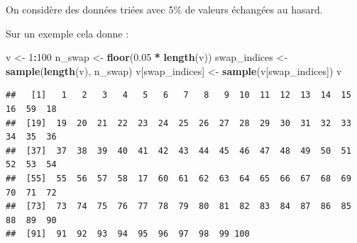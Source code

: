 \documentclass[
]{article}
\newenvironment{Shaded}{\begin{snugshade}}{\end{snugshade}}
\newcommand{\DecValTok}[1]{\textcolor[rgb]{0.00,0.00,0.81}{#1}}
\newcommand{\FloatTok}[1]{\textcolor[rgb]{0.00,0.00,0.81}{#1}}
\newcommand{\FunctionTok}[1]{\textcolor[rgb]{0.13,0.29,0.53}{\textbf{#1}}}
\newcommand{\NormalTok}[1]{#1}
\newcommand{\OtherTok}[1]{\textcolor[rgb]{0.56,0.35,0.01}{#1}}
\newcommand{\SpecialCharTok}[1]{\textcolor[rgb]{0.81,0.36,0.00}{\textbf{#1}}}
\begin{document}
On considère des données triées avec 5\% de valeurs échangées au hasard.

Sur un exemple cela donne :

\begin{Shaded}
\begin{Highlighting}[]
\NormalTok{v }\OtherTok{\textless{}{-}} \DecValTok{1}\SpecialCharTok{:}\DecValTok{100}
\NormalTok{n\_swap }\OtherTok{\textless{}{-}} \FunctionTok{floor}\NormalTok{(}\FloatTok{0.05} \SpecialCharTok{*} \FunctionTok{length}\NormalTok{(v))}
\NormalTok{swap\_indices }\OtherTok{\textless{}{-}} \FunctionTok{sample}\NormalTok{(}\FunctionTok{length}\NormalTok{(v), n\_swap)}
\NormalTok{v[swap\_indices] }\OtherTok{\textless{}{-}} \FunctionTok{sample}\NormalTok{(v[swap\_indices])}
\NormalTok{v}
\end{Highlighting}
\end{Shaded}

\begin{verbatim}
##   [1]   1   2   3   4   5   6   7   8   9  10  11  12  13  14  15  16  59  18
##  [19]  19  20  21  22  23  24  25  26  27  28  29  30  31  32  33  34  35  36
##  [37]  37  38  39  40  41  42  43  44  45  46  47  48  49  50  51  52  53  54
##  [55]  55  56  57  58  17  60  61  62  63  64  65  66  67  68  69  70  71  72
##  [73]  73  74  75  76  77  78  79  80  81  82  83  84  87  86  85  88  89  90
##  [91]  91  92  93  94  95  96  97  98  99 100
\end{verbatim}
\end{document}
